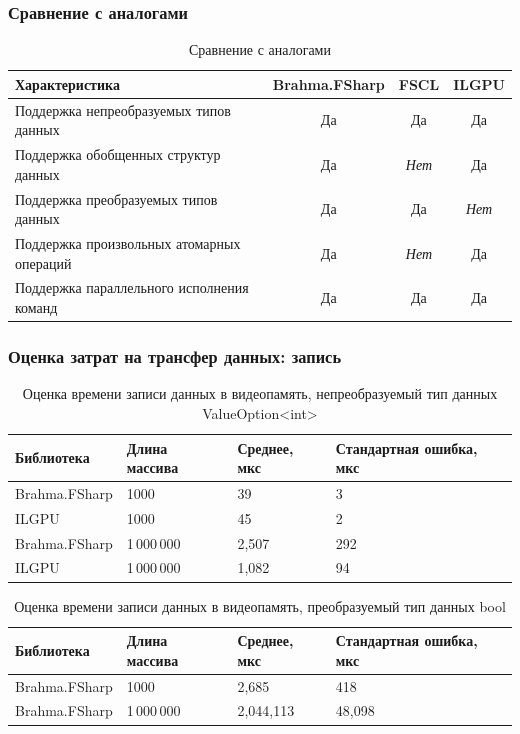 \documentclass[aspectratio=169]{beamer}
\begin{document}
\begin{frame}
\frametitle{Сравнение с аналогами}
\begin{table}[h]
    \begin{tabularx}{\textwidth}{|X|c|c|c|}
      \hline
      \textbf{Характеристика} & \textbf{Brahma.FSharp} & \textbf{FSCL} & \textbf{ILGPU} \\
      \hline
      Поддержка непреобразуемых типов данных & Да & Да & Да \\
      Поддержка обобщенных структур данных & Да & \textit{Нет} & Да \\
      Поддержка преобразуемых типов данных & Да & Да & \textit{Нет} \\
      \hline
      Поддержка произвольных атомарных операций & Да & \textit{Нет} & Да \\
      Поддержка параллельного исполнения команд & Да & Да & Да \\
      \hline
    \end{tabularx}
  \caption{Сравнение с аналогами}
  \label{tab:comp}
\end{table}
\end{frame}

\begin{frame}
    \frametitle{Оценка затрат на трансфер данных: запись}
    \begin{table}
    \begin{tabularx}{\textwidth}{|X|X|X|X|}
      \hline
      \textbf{Библиотека} & \textbf{Длина массива} & \textbf{Среднее, мкс} & \textbf{Стандартная ошибка, мкс} \\
      \hline
      Brahma.FSharp & 1000 & 39 & 3  \\
      ILGPU & 1000 & 45 & 2  \\
      \hline
      Brahma.FSharp & 1\,000\,000 & 2,507  & 292  \\
      ILGPU & 1\,000\,000 & 1,082 & 94 \\
      \hline
    \end{tabularx}
  \caption{Оценка времени записи данных в видеопамять, непреобразуемый тип данных ValueOption<int>}
  \label{tab:blit-w}
\end{table}

\begin{table}
    \begin{tabularx}{\textwidth}{|X|X|X|X|}
      \hline
      \textbf{Библиотека} & \textbf{Длина массива} & \textbf{Среднее, мкс} & \textbf{Стандартная ошибка, мкс} \\
      \hline
      Brahma.FSharp & 1000 & 2,685 & 418  \\
      \hline
      Brahma.FSharp & 1\,000\,000 & 2,044,113  & 48,098 \\
      \hline
    \end{tabularx}
  \caption{Оценка времени записи данных в видеопамять, преобразуемый тип данных bool}
  \label{tab:nonblit-w}
\end{table}
\end{frame}
\end{document}
